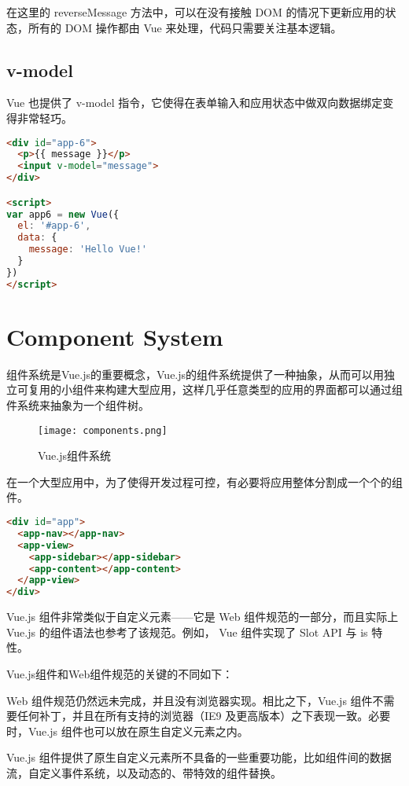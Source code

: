 在这里的 reverseMessage 方法中，可以在没有接触 DOM 的情况下更新应用的状态，所有的 DOM 操作都由 Vue 来处理，代码只需要关注基本逻辑。


\subsection{v-model}


Vue 也提供了 v-model 指令，它使得在表单输入和应用状态中做双向数据绑定变得非常轻巧。




\begin{lstlisting}[language=HTML]
<div id="app-6">
  <p>{{ message }}</p>
  <input v-model="message">
</div>

<script>
var app6 = new Vue({
  el: '#app-6',
  data: {
    message: 'Hello Vue!'
  }
})
</script>
\end{lstlisting}


\section{Component System}


组件系统是Vue.js的重要概念，Vue.js的组件系统提供了一种抽象，从而可以用独立可复用的小组件来构建大型应用，这样几乎任意类型的应用的界面都可以通过组件系统来抽象为一个组件树。


\begin{figure}[htbp]
\centering
\texttt{[image: components.png]}
\caption{Vue.js组件系统}
\end{figure}

在一个大型应用中，为了使得开发过程可控，有必要将应用整体分割成一个个的组件。

\begin{lstlisting}[language=HTML]
<div id="app">
  <app-nav></app-nav>
  <app-view>
    <app-sidebar></app-sidebar>
    <app-content></app-content>
  </app-view>
</div>
\end{lstlisting}


Vue.js 组件非常类似于自定义元素——它是 Web 组件规范的一部分，而且实际上 Vue.js 的组件语法也参考了该规范。例如， Vue 组件实现了 Slot API 与 is 特性。

Vue.js组件和Web组件规范的关键的不同如下：

\begin{compactenum}
\item Web 组件规范仍然远未完成，并且没有浏览器实现。相比之下，Vue.js 组件不需要任何补丁，并且在所有支持的浏览器（IE9 及更高版本）之下表现一致。必要时，Vue.js 组件也可以放在原生自定义元素之内。
\item Vue.js 组件提供了原生自定义元素所不具备的一些重要功能，比如组件间的数据流，自定义事件系统，以及动态的、带特效的组件替换。
\end{compactenum}

